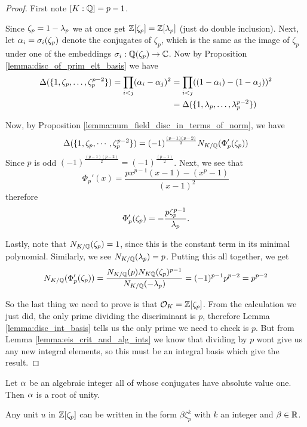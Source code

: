 \begin{proof}
	First note $[K:\mathbb{Q}]=p-1$.

	Since $\zeta_p=1-\lambda_p$ we at once get $\mathbb{Z}[\zeta_p]=\mathbb{Z}[\lambda_p]$ (just do double inclusion). Next, let $\alpha_i=\sigma_i(\zeta_p)$ denote the conjugates of $\zeta_p$, which is the same as the image of $\zeta_p$ under one of the embeddings $\sigma_i: \mathbb{Q}(\zeta_p) \to \mathbb{C}$. Now  by Proposition \ref{lemma:disc_of_prim_elt_basis} we have \begin{align*}\Delta(\{1,\zeta_p,\dots,\zeta_p^{p-2}\})=\prod_{i < j}  (\alpha_i-\alpha_j)^2 &=\prod_{i < j}  ((1-\alpha_i)-(1-\alpha_j))^2\\&=\Delta(\{1,\lambda_p,\dots,\lambda_p^{p-2}\})\end{align*}

	Now, by Proposition \ref{lemma:num_field_disc_in_terms_of_norm}, we have \[\Delta(\{1,\zeta_p,\cdots,\zeta_p^{p-2}\})=(-1)^{\frac{(p-1)(p-2)}{2}}N_{K/\mathbb{Q}}(\Phi_p'(\zeta_p)  )\]
	Since $p$ is odd $(-1)^{\frac{(p-1)(p-2)}{2}}=(-1)^{\frac{(p-1)}{2}}$. Next, we see that \[\Phi_p'(x)=\frac{px^{p-1}(x-1)-(x^p-1)}{(x-1)^2}\] therefore \[\Phi_p'(\zeta_p)=-\frac{p\zeta_p^{p-1}}{\lambda_p}.\]

	Lastly, note that $N_{K/\mathbb{Q}}(\zeta_p)=1$, since this is the constant term in its minimal polynomial. Similarly, we see $N_{K/\mathbb{Q}}(\lambda_p)=p$. Putting this all together, we get \[N_{K/\mathbb{Q}}(\Phi_p'(\zeta_p)  )=\frac{N_{K/\mathbb{Q}}(p)N_{K\mathbb{Q}}(\zeta_p)^{p-1}}{N_{K/\mathbb{Q}}(-\lambda_p)}=(-1)^{p-1}p^{p-2}=p^{p-2}\]

	So the last thing we need to prove is that $\mathcal{O}_K=\mathbb{Z}[\zeta_p]$. From the calculation we just did, the only prime dividing the discriminant is $p$, therefore Lemma \ref{lemma:disc_int_basis} tells us the only prime we need to check is $p$. But from Lemma \ref{lemma:eis_crit_and_alg_ints} we know that dividing by $p$ wont give us any new integral elements, so this must be an integral basis which give the result.
\end{proof}

\begin{lemma}\label{lemma:alg_int_abs_val_one}
	Let $\alpha$ be an algebraic integer all of whose conjugates have absolute value one. Then $\alpha$ is a root of unity.
\end{lemma}


\begin{lemma}\label{lemma:unit_lemma}
	Any unit $u$ in $\mathbb{Z}[\zeta_p]$ can be written in the form $\beta \zeta_p^k  $ with $k$ an integer and $\beta \in \mathbb{R}$.
\end{lemma}

